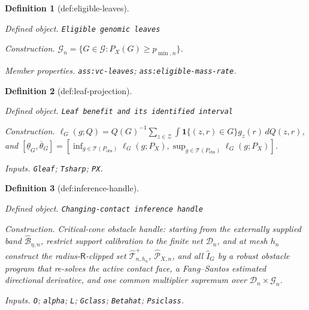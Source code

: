 \documentclass{article}
\newtheorem{definition}{Definition}
\begin{document}
\begin{definition}[def:eligible-leaves]\label{def:eligible-leaves}
\par\smallskip\noindent\emph{Defined object.} \texttt{Eligible genomic leaves}
\par\smallskip\noindent\emph{Construction.} \(\mathcal G_n=\{G\in\mathcal G:P_X(G)\ge p_{\min,n}\}\).
\par\smallskip\noindent\emph{Member properties.} \texttt{ass:\allowbreak{}vc-\allowbreak{}leaves}; \texttt{ass:\allowbreak{}eligible-\allowbreak{}mass-\allowbreak{}rate}.
\end{definition}

\begin{definition}[def:leaf-projection]\label{def:leaf-projection}
\par\smallskip\noindent\emph{Defined object.} \texttt{Leaf benefit and its identified interval}
\par\smallskip\noindent\emph{Construction.} \(\ell_G(g;Q)=Q(G)^{-1}\sum_{z\in\mathcal Z}\int\mathbf 1\{(z,r)\in G\}g_z(r)\,dQ(z,r)\), and \([\underline\theta_G,\overline\theta_G]=[\inf_{g\in\mathcal T(P_{\mathrm{obs}})}\ell_G(g;P_X),\sup_{g\in\mathcal T(P_{\mathrm{obs}})}\ell_G(g;P_X)]\).
\par\smallskip\noindent\emph{Inputs.} \texttt{Gleaf}; \texttt{Tsharp}; \texttt{PX}.
\end{definition}

\begin{definition}[def:inference-handle]\label{def:inference-handle}
\par\smallskip\noindent\emph{Defined object.} \texttt{Changing-\allowbreak{}contact inference handle}
\par\smallskip\noindent\emph{Construction.} Critical-cone obstacle handle: starting from the externally supplied band \(\widehat{\mathcal B}_{\eta,n}\), restrict support calibration to the finite net \(\mathcal D_n\), and at mesh \(h_n\) construct the radius-\(\mathsf R\)-clipped set \(\widehat{\mathcal T}_{n,h_n}^{+}\), \(\widehat{\mathcal P}_{X,n}\), and all \(\widehat I_G\) by a robust obstacle program that re-solves the active contact face, a Fang--Santos estimated directional derivative, and one common multiplier supremum over \(\mathcal D_n\times\mathcal G_n\).
\par\smallskip\noindent\emph{Inputs.} \texttt{O}; \texttt{alpha}; \texttt{L}; \texttt{Gclass}; \texttt{Betahat}; \texttt{Psiclass}.
\end{definition}
\end{document}

